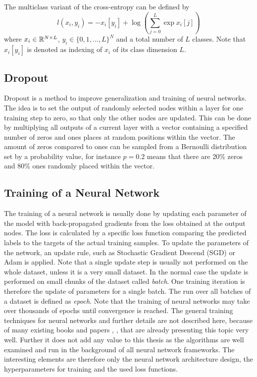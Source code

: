 The multiclass variant of the cross-entropy can be defined by
\begin{equation}
  l(x_i, y_i) = - x_i[y_i] + \log{\left( \sum_{j=0}^{L} \exp{x_i[j]} \right)}
\end{equation}
where $x_i \in \mathbb{R}^{N \times L}$, $y_i \in \{0, 1, \dots, L\}^N$ and a total number of $L$ classes.
Note that $x_i[y_i]$ is denoted as indexing of $x_i$ of its class dimension $L$. 



\subsection{Dropout}
Dropout \cite{Hinton2012} is a method to improve generalization and training of neural networks.
The idea is to set the output of randomly selected nodes within a layer for one training step to zero, so that only the other nodes are updated.
This can be done by multiplying all outputs of a current layer with a vector containing a specified number of zeros and ones places at random positions within the vector.
The amount of zeros compared to ones can be sampled from a Bernoulli distribution set by a probability value, for instance $p=0.2$ means that there are 20\% zeros and 80\% ones randomly placed within the vector.



\subsection{Training of a Neural Network}
The training of a neural network is usually done by updating each parameter of the model with back-propagated gradients from the loss obtained at the output nodes.
The loss is calculated by a specific loss function comparing the predicted labels to the targets of the actual training samples.
To update the parameters of the network, an update rule, such as Stochastic Gradient Descend (SGD) or Adam \cite{Kingma2015} is applied.
Note that a single update step is usually not performed on the whole dataset, unless it is a very small dataset. 
In the normal case the update is performed on small chunks of the dataset called \emph{batch}.
One training iteration is therefore the update of parameters for a single batch.
The run over all batches of a dataset is defined as \emph{epoch}.
Note that the training of neural networks may take over thousands of epochs until convergence is reached.
The general training techniques for neural networks and further details are not described here, because of many existing books and papers \cite{LeCun2006}, \cite{Goodfellow2016}, \cite{DeepLearning} that are already presenting this topic very well. 
Further it does not add any value to this thesis as the algorithms are well examined and run in the background of all neural network frameworks.
The interesting elements are therefore only the neural network architecture design, the hyperparameters for training and the used loss functions.


